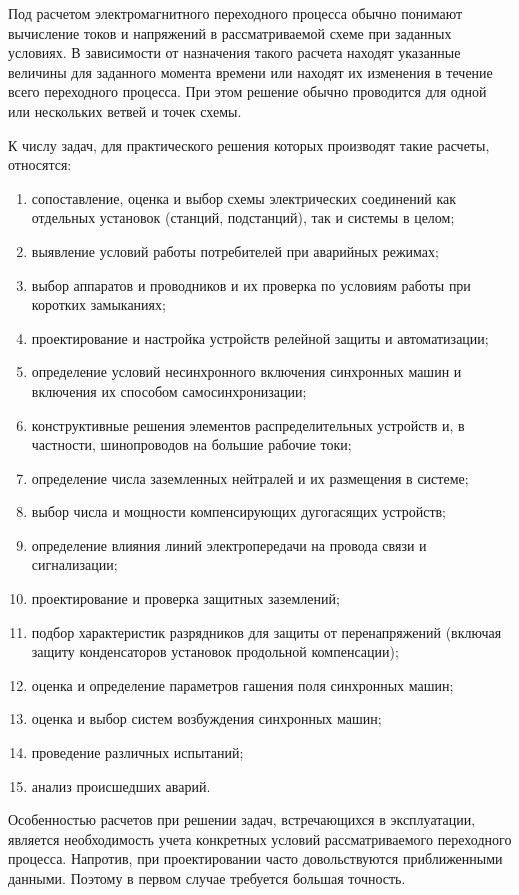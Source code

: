 Под расчетом электромагнитного переходного процесса обычно понимают вычисление токов и напряжений в рассматриваемой схеме при заданных условиях. В зависимости от назначения такого расчета находят указанные величины для заданного момента времени или находят их изменения в течение всего переходного процесса. При этом решение обычно проводится для одной или нескольких ветвей и точек схемы.

К числу задач, для практического решения которых производят такие расчеты, относятся:

\begin{enumerate} 
	\item
	сопоставление, оценка и выбор схемы электрических соединений как отдельных установок (станций, подстанций), так и системы в целом;
	\item
	выявление условий работы потребителей при аварийных режимах;
	\item
	выбор аппаратов и проводников и их проверка по условиям работы при коротких замыканиях;
	\item
	проектирование и настройка устройств релейной защиты и автоматизации;
	\item
	определение условий несинхронного включения синхронных машин и включения их способом самосинхронизации;
	\item
	конструктивные решения элементов распределительных устройств и, в частности, шинопроводов на большие рабочие токи;
	\item
	определение числа заземленных нейтралей и их размещения в системе;
	\item
	выбор числа и мощности компенсирующих дугогасящих устройств;
	\item
	определение влияния линий электропередачи на провода связи и сигнализации;
	\item
	проектирование и проверка защитных заземлений;
	\item
	подбор характеристик разрядников для защиты от перенапряжений (включая защиту конденсаторов установок продольной компенсации);
	\item
	оценка и определение параметров гашения поля синхронных машин;
	\item
	оценка и выбор систем возбуждения синхронных машин;
	\item
	проведение различных испытаний;
	\item
	анализ происшедших аварий.
\end{enumerate}

Особенностью расчетов при решении задач, встречающихся в эксплуатации, является необходимость учета конкретных условий рассматриваемого переходного процесса. Напротив, при проектировании часто довольствуются приближенными данными. Поэтому в первом случае требуется большая точность.

